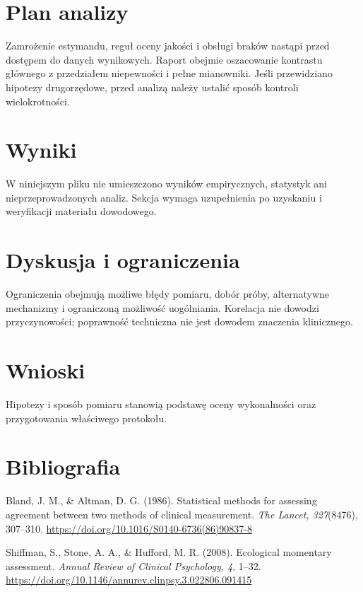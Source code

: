 \documentclass[11pt,a4paper]{article}
\begin{document}
\section{Plan analizy}

Zamrożenie estymandu, reguł oceny jakości i obsługi braków nastąpi przed dostępem do danych wynikowych. Raport obejmie oszacowanie kontrastu głównego z przedziałem niepewności i pełne mianowniki. Jeśli przewidziano hipotezy drugorzędowe, przed analizą należy ustalić sposób kontroli wielokrotności.

\section{Wyniki}

W niniejszym pliku nie umieszczono wyników empirycznych, statystyk ani nieprzeprowadzonych analiz. Sekcja wymaga uzupełnienia po uzyskaniu i weryfikacji materiału dowodowego.

\section{Dyskusja i ograniczenia}

Ograniczenia obejmują możliwe błędy pomiaru, dobór próby, alternatywne mechanizmy i ograniczoną możliwość uogólniania. Korelacja nie dowodzi przyczynowości; poprawność techniczna nie jest dowodem znaczenia klinicznego.

\section{Wnioski}

Hipotezy i sposób pomiaru stanowią podstawę oceny wykonalności oraz przygotowania właściwego protokołu.

\section*{Bibliografia}

{\setlength{\parindent}{0pt}
\setlength{\parskip}{5pt}
\hangindent=1.27cm
Bland, J. M., \& Altman, D. G. (1986). Statistical methods for assessing agreement between two methods of clinical measurement. \textit{The Lancet, 327}(8476), 307--310. \url{https://doi.org/10.1016/S0140-6736(86)90837-8}\par
\hangindent=1.27cm
Shiffman, S., Stone, A. A., \& Hufford, M. R. (2008). Ecological momentary assessment. \textit{Annual Review of Clinical Psychology, 4}, 1--32. \url{https://doi.org/10.1146/annurev.clinpsy.3.022806.091415}\par
}
\end{document}
